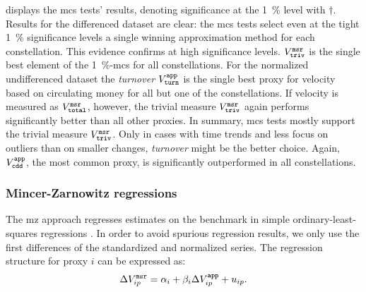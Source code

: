 \renewcommand{\captionGlo} {%
  Mean absolute error for normalized data of approximation methods compared %
  to measurement methods with $\perd = \wndwLength = 1 \ttext{ day} $. %
  Proxy-variables in \SI{1}{\percent} \acl{mcs} marked by $\dag$.%
}%
\renewcommand{\labelGlo}{\label{tbl:errortable}}%
%
\addtolength{\tabcolsep}{-2pt} \renewcommand{\captionGlo} {\acl{mcs}
  regressions for standardized and normalized approximation and measurement
  data with $\perd = \wndwLength = 1 \ttext{ day}$.}%
\renewcommand{\labelGlo} {\label{tbl:mzregression}}%
 \addtolength{\tabcolsep}{+2pt}


 displays the \ac{mcs} tests' results, denoting
significance at the \SI{1}{\percent} level with $\dag$.  %
Results for the differenced dataset are clear: the \ac{mcs} tests select even
at the tight \SI{1}{\percent} significance levels a single winning
approximation method for each constellation.  %
This evidence confirms  at high
significance levels.  %
${V_{\mathtt{triv}}^{\mathtt{msr}}}$ is the single best element of the \SI{1}{\percent}-\ac{mcs} for
all constellations.  %
For the normalized undifferenced dataset the \emph{turnover} ${V^{{\mathtt{app}}}_{\mathtt{turn}}}$ is
the single best proxy for velocity based on circulating money for all but one
of the constellations. %
If velocity is measured as ${V_{\mathtt{total}}^{\mathtt{msr}}}$, however, the trivial measure
${V_{\mathtt{triv}}^{\mathtt{msr}}}$ again performs significantly better than all other proxies.  %
In summary, \ac{mcs} tests mostly support the trivial measure
${V_{\mathtt{triv}}^{\mathtt{msr}}}$.  %
Only in cases with time trends and less focus on outliers than on smaller
changes, \emph{turnover} might be the better choice.  %
Again, ${V^{{\mathtt{app}}}_{\mathtt{cdd}}}$, the most common proxy, is significantly outperformed in all
constellations.  %


\subsubsection{Mincer-Zarnowitz regressions}\label{sec:results:sub:comp:subsub:mzr}%
The \ac{mz} approach regresses estimates on the benchmark in simple
ordinary-least-squares regressions \citep{mincer1969evaluation}.  %
In order to avoid spurious regression results, we only use the first
differences of the standardized and normalized series.  %
The regression structure for proxy $i$ can be expressed as:
\begin{align*}
  \Delta V^{{\mathtt{msr}}}_{i {p}} = \alpha_{i} + \beta_{i} \Delta V^{{\mathtt{app}}}_{i
  {p}} + u_{i {p}}.
\end{align*}

